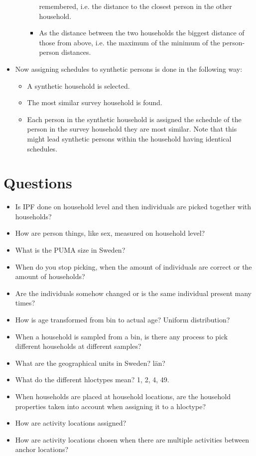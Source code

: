 \documentclass[12pt]{article}
\begin{document}
\begin{itemize}
\begin{itemize}
\begin{itemize}
remembered, i.e. the distance to the closest person in the other household.
\item
As the distance between the two households the biggest distance of those from
above, i.e. the maximum of the minimum of the person-person distances.
\end{itemize}
\end{itemize}
\item
Now assigning schedules to synthetic persons is done in the following way:
\begin{itemize}
\item
A synthetic household is selected.
\item
The most similar survey household is found.
\item
Each person in the synthetic household is assigned the schedule of the person in
the survey household they are most similar. Note that this might lead synthetic
persons within the household having identical schedules.
\end{itemize}
\end{itemize}

\section{Questions}
\begin{itemize}
\item
Is IPF done on household level and then individuals are picked together with
households?
\item 
How are person things, like sex, measured on household level?
\item
What is the PUMA size in Sweden?
\item
When do you stop picking, when the amount of individuals are correct or the
amount of households?
\item
Are the individuals somehow changed or is the same individual present many
times?
\item
How is age transformed from bin to actual age? Uniform distribution?
\item
When a household is sampled from a bin, is there any process to pick different
households at different samples?
\\
\item
What are the geographical units in Sweden? län?
\item
What do the different hloctypes mean? 1, 2, 4, 49.
\item
When households are placed at household locations, are the household properties
taken into account when assigning it to a hloctype?
\item
How are activity locations assigned?
\item 
How are activity locations chosen when there are multiple activities between
anchor locations?
\end{itemize}
\end{document}
